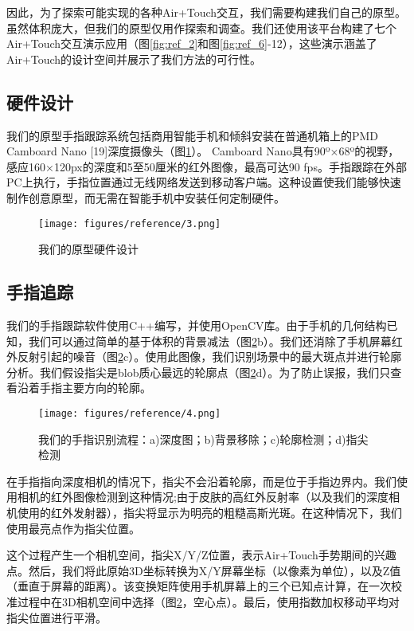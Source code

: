 因此，为了探索可能实现的各种Air+Touch交互，我们需要构建我们自己的原型。虽然体积庞大，但我们的原型仅用作探索和调查。我们还使用该平台构建了七个Air+Touch交互演示应用（图\ref{fig:ref_2}和图\ref{fig:ref_6}-12），这些演示涵盖了Air+Touch的设计空间并展示了我们方法的可行性。

\subsection{硬件设计}

我们的原型手指跟踪系统包括商用智能手机和倾斜安装在普通机箱上的PMD Camboard Nano [19]深度摄像头（图\ref{fig:ref_3}）。 Camboard Nano具有90º×68º的视野，感应160×120px的深度和5至50厘米的红外图像，最高可达90 fps。手指跟踪在外部PC上执行，手指位置通过无线网络发送到移动客户端。这种设置使我们能够快速制作创意原型，而无需在智能手机中安装任何定制硬件。

\begin{figure}
\centering
\texttt{[image: figures/reference/3.png]}
\caption{我们的原型硬件设计}
\label{fig:ref_3}
\end{figure}

\subsection{手指追踪}

我们的手指跟踪软件使用C++编写，并使用OpenCV库。由于手机的几何结构已知，我们可以通过简单的基于体积的背景减法（图\ref{fig:ref_4}b）。我们还消除了手机屏幕红外反射引起的噪音（图\ref{fig:ref_4}c）。使用此图像，我们识别场景中的最大斑点并进行轮廓分析。我们假设指尖是blob质心最远的轮廓点（图\ref{fig:ref_4}d）。为了防止误报，我们只查看沿着手指主要方向的轮廓。

\begin{figure}
\centering
\texttt{[image: figures/reference/4.png]}
\caption{我们的手指识别流程：a)深度图；b)背景移除；c)轮廓检测；d)指尖检测}
\label{fig:ref_4}
\end{figure}

在手指指向深度相机的情况下，指尖不会沿着轮廓，而是位于手指边界内。我们使用相机的红外图像检测到这种情况;由于皮肤的高红外反射率（以及我们的深度相机使用的红外发射器），指尖将显示为明亮的粗糙高斯光斑。在这种情况下，我们使用最亮点作为指尖位置。

这个过程产生一个相机空间，指尖X/Y/Z位置，表示Air+Touch手势期间的兴趣点。然后，我们将此原始3D坐标转换为X/Y屏幕坐标（以像素为单位），以及Z值（垂直于屏幕的距离）。该变换矩阵使用手机屏幕上的三个已知点计算，在一次校准过程中在3D相机空间中选择（图\ref{fig:ref_4}，空心点）。最后，使用指数加权移动平均对指尖位置进行平滑。


